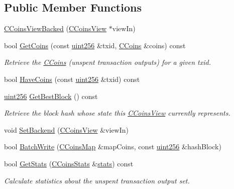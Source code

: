 \subsection*{Public Member Functions}
\begin{DoxyCompactItemize}
\item 
\hyperlink{class_c_coins_view_backed_af86a3b07433e8d84678772411791125e}{C\+Coins\+View\+Backed} (\hyperlink{class_c_coins_view}{C\+Coins\+View} $\ast$view\+In)
\item 
bool \hyperlink{class_c_coins_view_backed_a21b95a9910f94e9b7ebed62a6f329ea0}{Get\+Coins} (const \hyperlink{classuint256}{uint256} \&txid, \hyperlink{class_c_coins}{C\+Coins} \&coins) const 
\begin{DoxyCompactList}\small\item\em Retrieve the \hyperlink{class_c_coins}{C\+Coins} (unspent transaction outputs) for a given txid. \end{DoxyCompactList}\item 
bool \hyperlink{class_c_coins_view_backed_a6a769cf9cc55128dea8e1a2798056e71}{Have\+Coins} (const \hyperlink{classuint256}{uint256} \&txid) const 
\item 
\hyperlink{classuint256}{uint256} \hyperlink{class_c_coins_view_backed_a8465dc4764fd5b01591b824551cbbfab}{Get\+Best\+Block} () const 
\begin{DoxyCompactList}\small\item\em Retrieve the block hash whose state this \hyperlink{class_c_coins_view}{C\+Coins\+View} currently represents. \end{DoxyCompactList}\item 
void \hyperlink{class_c_coins_view_backed_a7eaddfbfd401a95c2fda2a8d8feaaf73}{Set\+Backend} (\hyperlink{class_c_coins_view}{C\+Coins\+View} \&view\+In)
\item 
bool \hyperlink{class_c_coins_view_backed_ace15da3934c9d7a9cb9c7a787f92f764}{Batch\+Write} (\hyperlink{coins_8h_a2886ba2fd0428bae777e1cbcabc02834}{C\+Coins\+Map} \&map\+Coins, const \hyperlink{classuint256}{uint256} \&hash\+Block)
\item 
bool \hyperlink{class_c_coins_view_backed_a368f277ac68652a91ac171f46f02edca}{Get\+Stats} (\hyperlink{struct_c_coins_stats}{C\+Coins\+Stats} \&\hyperlink{db__bench_8cc_a5925d216740c89f43482df806fd14e8c}{stats}) const 
\begin{DoxyCompactList}\small\item\em Calculate statistics about the unspent transaction output set. \end{DoxyCompactList}\end{DoxyCompactItemize}
